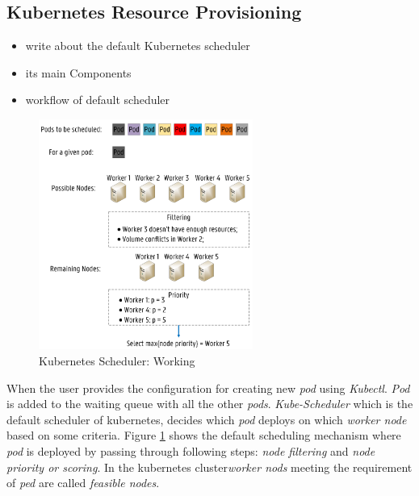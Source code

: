 \subsection{Kubernetes Resource Provisioning}
\label{sec:k8s_scheduler}
\begin{itemize}
  \item write about the default Kubernetes scheduler
  \item its main Components
  \item workflow of default scheduler
\end{itemize}
\begin{figure}
  \includegraphics[width=70mm]{figures/mlcn-k8s-scheduler.pdf}
  \caption{Kubernetes Scheduler: Working\cite{Santos2019}}
  \label{fig:k8s-sch}
\end{figure}
When the user provides the configuration for creating new \emph{pod} using \emph{Kubectl}. \emph{Pod} is added to the waiting queue with all the other \emph{pods}. \emph{Kube-Scheduler} which is the default scheduler of kubernetes, decides which \emph{pod} deploys on which \emph{worker node} based on some criteria. Figure \ref{fig:k8s-sch} shows the default scheduling mechanism where \emph{pod} is deployed by passing through following steps: \emph{node filtering} and \emph{node priority or scoring}\cite{Santos2019}. In the kubernetes cluster\emph{worker nods} meeting the requirement of \emph{ped} are called \emph{feasible nodes}\cite{k8s}.
